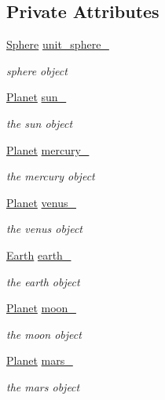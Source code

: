 \subsection*{Private Attributes}
\begin{DoxyCompactItemize}
\item 
\hyperlink{classSphere}{Sphere} \hyperlink{classSolar__viewer_a47d90d63f22fd4e9e58651e9e9c7baef}{unit\+\_\+sphere\+\_\+}
\begin{DoxyCompactList}\small\item\em sphere object \end{DoxyCompactList}\item 
\hyperlink{classPlanet}{Planet} \hyperlink{classSolar__viewer_a381a824e3e1a2c6bff1bd67bf615ffdb}{sun\+\_\+}
\begin{DoxyCompactList}\small\item\em the sun object \end{DoxyCompactList}\item 
\hyperlink{classPlanet}{Planet} \hyperlink{classSolar__viewer_ac6f237c0c02818cb2f5beac34a6ec253}{mercury\+\_\+}
\begin{DoxyCompactList}\small\item\em the mercury object \end{DoxyCompactList}\item 
\hyperlink{classPlanet}{Planet} \hyperlink{classSolar__viewer_a52df2043cba78b9afef933ce6515303d}{venus\+\_\+}
\begin{DoxyCompactList}\small\item\em the venus object \end{DoxyCompactList}\item 
\hyperlink{classEarth}{Earth} \hyperlink{classSolar__viewer_a769d9e8775ba2106682964488117e695}{earth\+\_\+}
\begin{DoxyCompactList}\small\item\em the earth object \end{DoxyCompactList}\item 
\hyperlink{classPlanet}{Planet} \hyperlink{classSolar__viewer_a28f77d042e23dd0dab3be944c4c5b135}{moon\+\_\+}
\begin{DoxyCompactList}\small\item\em the moon object \end{DoxyCompactList}\item 
\hyperlink{classPlanet}{Planet} \hyperlink{classSolar__viewer_a1d1582410c9e761b14796329eff12b08}{mars\+\_\+}
\begin{DoxyCompactList}\small\item\em the mars object \end{DoxyCompactList}\item 

\end{DoxyCompactItemize}
